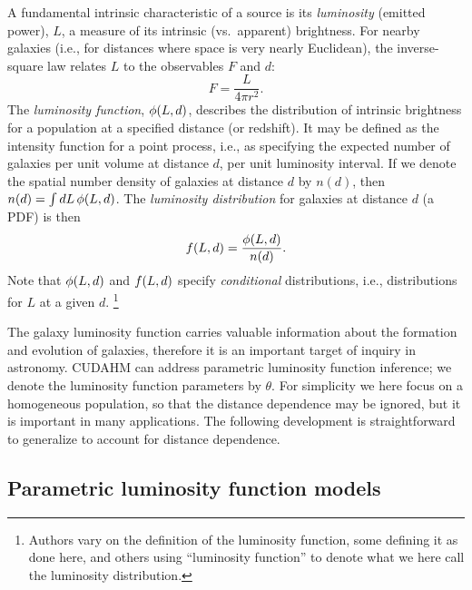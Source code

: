 A fundamental intrinsic characteristic of a source is its \emph{luminosity} (emitted power), $L$, a measure of its intrinsic (vs.\ apparent) brightness.
For nearby galaxies (i.e., for distances where space is very nearly Euclidean), the inverse-square law relates $L$ to the observables $F$ and $d$:
\[
F=\frac{L}{4\pi r^2}.
\label{eq:inv-sqr}
\]
The \emph{luminosity function}, $\phi(L, d)$, describes the distribution of intrinsic brightness for a population at a specified distance (or redshift).
It may be defined as the intensity function for a point process, i.e., as specifying the expected number of galaxies per unit volume at distance $d$, per unit luminosity interval.
If we denote the spatial number density of galaxies at distance $d$ by $n(d)$, then $n(d) = \int dL\, \phi(L, d)$.
The \emph{luminosity distribution} for galaxies at distance $d$ (a PDF) is then
\[
f(L,d) = \frac{\phi(L, d)}{n(d)}.
\label{eq:lpdf}
\]
Note that $\phi(L,d)$ and $f(L,d)$ specify \emph{conditional} distributions, i.e., distributions for $L$ at a given $d$.%
\footnote{Authors vary on the definition of the luminosity function, some defining it as done here, and others using ``luminosity function'' to denote what we here call the luminosity distribution.}

The galaxy luminosity function carries valuable information about the formation and evolution of galaxies, therefore it is an important target of inquiry in astronomy.
CUDAHM can address parametric luminosity function inference; we denote the luminosity function parameters by $\theta$.
For simplicity we here focus on a homogeneous population, so that the distance dependence may be ignored, but it is important in many applications.
The following development is straightforward to generalize to account for distance dependence.

\subsection{Parametric luminosity function models}
\label{sec:lfmodels}

